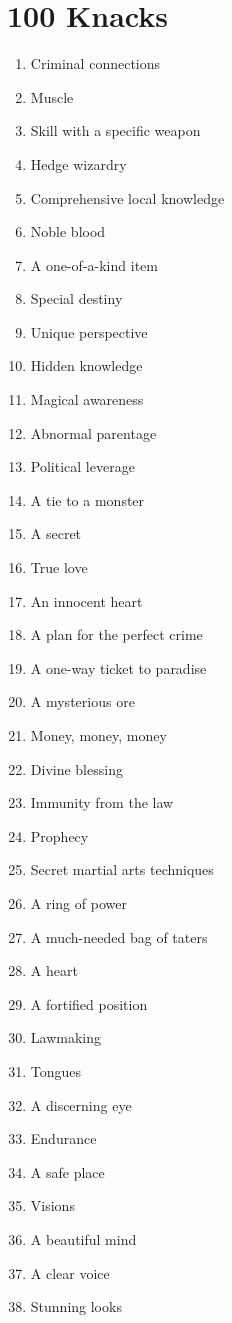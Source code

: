 \section*{100 Knacks}
\begin{enumerate}
\item Criminal connections
\item Muscle
\item Skill with a specific weapon
\item Hedge wizardry
\item Comprehensive local knowledge
\item Noble blood
\item A one-of-a-kind item
\item Special destiny
\item Unique perspective
\item Hidden knowledge
\item Magical awareness
\item Abnormal parentage
\item Political leverage
\item A tie to a monster
\item A secret
\item True love
\item An innocent heart
\item A plan for the perfect crime
\item A one-way ticket to paradise
\item A mysterious ore
\item Money, money, money
\item Divine blessing
\item Immunity from the law
\item Prophecy
\item Secret martial arts techniques
\item A ring of power
\item A much-needed bag of taters
\item A heart
\item A fortified position
\item Lawmaking
\item Tongues
\item A discerning eye
\item Endurance
\item A safe place
\item Visions
\item A beautiful mind
\item A clear voice
\item Stunning looks

\end{enumerate}

